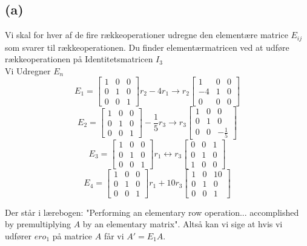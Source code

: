 \documentclass[a4paper,fleqn]{article}
\begin{document}
	\subsection{(a)}
	Vi skal for hver af de fire rækkeoperationer udregne den elementære matrice $E_{ij}$ som
	svarer til rækkeoperationen. Du finder elementærmatricen ved at udføre rækkeoperationen på
	Identitetsmatricen $I_3$\\
	Vi Udregner $E_n$\\
	\[ E_1 = \begin{bmatrix}1&0&0\\0&1&0\\0&0&1\end{bmatrix} r_2 - 4r_1 \rightarrow r_2 
	\begin{bmatrix} 1 & 0 & 0 \\ -4 & 1 & 0 \\ 0 & 0 & 0 \end{bmatrix} \]
	\[ E_2 = \begin{bmatrix}1&0&0\\0&1&0\\0&0&1\end{bmatrix} -\frac{1}{5}r_3 \rightarrow r_3
	\begin{bmatrix}1&0&0\\0&1&0\\0&0&-\frac{1}{5}\end{bmatrix}\]
	\[ E_3 = \begin{bmatrix}1&0&0\\0&1&0\\0&0&1\end{bmatrix} r_1 \leftrightarrow r_3 
	\begin{bmatrix}0&0&1\\0&1&0\\1&0&0\end{bmatrix}\]
	\[ E_4 = \begin{bmatrix}1&0&0\\0&1&0\\0&0&1\end{bmatrix} r_1 + 10r_3 
	\begin{bmatrix}1&0&10\\0&1&0\\0&0&1\end{bmatrix}\]

	Der står i lærebogen: "Performing an elementary row operation... accomplished by
	premultiplying $A$ by an elementary matrix". Altså kan vi sige at hvis vi udfører $ero_1$
	på matrice $A$ får vi $A' = E_1A$.\\
\end{document}

